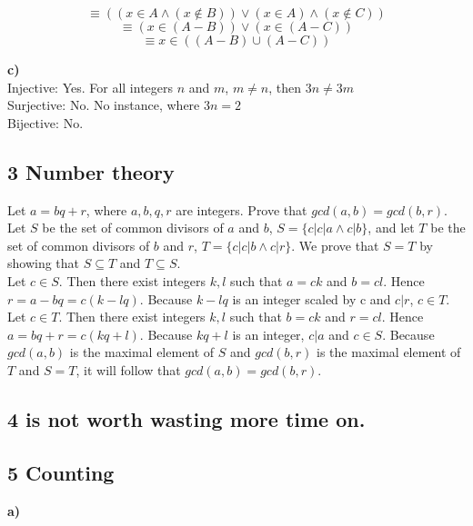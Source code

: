 \documentclass[12pt]{article}
\begin{document}
$$
\equiv ((x \in A \wedge (x \notin B)) \vee (x \in A) \wedge (x \notin C))
$$
$$
\equiv (x \in (A-B)) \vee (x \in (A-C))
$$
$$
\equiv x \in ((A-B) \cup (A-C))
$$

\textbf{c)} \\

Injective: Yes. For all integers $n$ and $m$, $m \neq n$, then $3n \neq 3m$\\
Surjective: No. No instance, where $3n = 2$ \\
Bijective: No.

\subsection{3 Number theory}

Let $a = bq + r$, where $a,b,q,r$ are integers. Prove that $gcd(a,b) = gcd(b,r)$. \\
Let $S$ be the set of common divisors of $a$ and $b$, $S = \{ c | c|a \wedge c|b \}$, and let $T$ be the set of common divisors of $b$ and $r$,
$T = \{ c | c|b \wedge c|r \}$. We prove that $S = T$ by showing that $S \subseteq T$ and $T \subseteq S$. \\
Let $c \in S$. Then there exist integers $k,l$ such that $a = ck$ and $b = cl$. Hence $r = a - bq = c (k-lq)$. Because $k-lq$ is an integer scaled by c and $c|r$, $c \in T$. \\

Let $c \in T$. Then there exist integers $k,l$ such that $b = ck$ and $r = cl$. Hence $a = bq + r = c (kq + l)$. Because $kq + l$ is an integer, $c | a$ and $c \in S$.
Because $gcd(a,b)$ is the maximal element of $S$ and $gcd(b,r)$ is the maximal element of $T$ and $S=T$, it will follow that $gcd(a,b) = gcd(b,r)$.


\subsection{4 is not worth wasting more time on.}
\subsection{5 Counting}

\textbf{a)}
\end{document}
